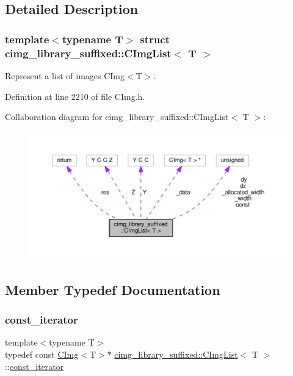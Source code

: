 \subsection{Detailed Description}
\subsubsection*{template$<$typename T$>$\newline
struct cimg\+\_\+library\+\_\+suffixed\+::\+C\+Img\+List$<$ T $>$}

Represent a list of images C\+Img$<$\+T$>$. 

Definition at line 2210 of file C\+Img.\+h.



Collaboration diagram for cimg\+\_\+library\+\_\+suffixed\+:\+:C\+Img\+List$<$ T $>$\+:
\nopagebreak
\begin{figure}[H]
\begin{center}
\leavevmode
\includegraphics[width=350pt]{dc/d20/structcimg__library__suffixed_1_1CImgList__coll__graph}
\end{center}
\end{figure}


\subsection{Member Typedef Documentation}
\mbox{\label{structcimg__library__suffixed_1_1CImgList_aabe27c2b223cefcbdf081b4a7220a12c}} 
\subsubsection{\texorpdfstring{const\+\_\+iterator}{const\_iterator}}
{\footnotesize\ttfamily template$<$typename T$>$ \\
typedef const \hyperlink{structcimg__library__suffixed_1_1CImg}{C\+Img}$<$T$>$$\ast$ \hyperlink{structcimg__library__suffixed_1_1CImgList}{cimg\+\_\+library\+\_\+suffixed\+::\+C\+Img\+List}$<$ T $>$\+::\hyperlink{structcimg__library__suffixed_1_1CImgList_aabe27c2b223cefcbdf081b4a7220a12c}{const\+\_\+iterator}}



